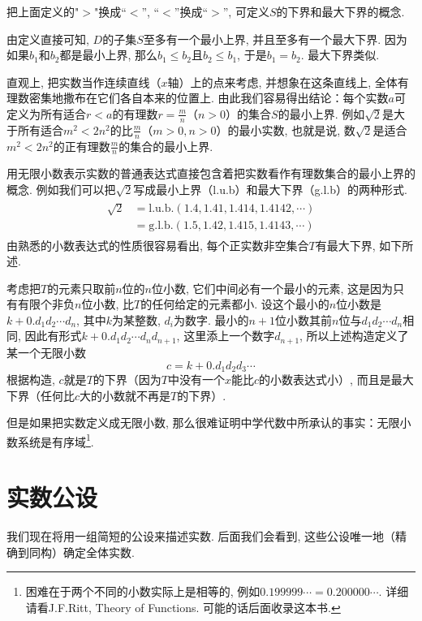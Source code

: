 把上面定义的"$>$"换成“$<$”, “$<$”换成“$>$”, 可定义$S$的下界和最大下界的概念. 

由定义直接可知, $D$的子集$S$至多有一个最小上界, 并且至多有一个最大下界. 因为如果$b_1$和$b_2$都是最小上界, 那么$b_1 \le b_2$且$b_2 \le b_1$, 于是$b_1=b_2$. 最大下界类似. 

直观上, 把实数当作连续直线（$x$轴）上的点来考虑, 并想象在这条直线上, 全体有理数密集地撒布在它们各自本来的位置上. 由此我们容易得出结论：每个实数$a$可定义为所有适合$r < a$的有理数$r = \frac{m}{n}$（$n > 0$）的集合$S$的最小上界. 例如$\sqrt{2}$是大于所有适合$m^2 < 2n^2$的比$\frac{m}{n}$（$m > 0, n > 0$）的最小实数, 也就是说, 数$\sqrt{2}$是适合$m^2<2n^2$的正有理数$\frac{m}{n}$的集合的最小上界. 

用无限小数表示实数的普通表达式直接包含着把实数看作有理数集合的最小上界的概念. 例如我们可以把$\sqrt{2}$写成最小上界（l.u.b）和最大下界（g.l.b）的两种形式. 
\begin{gather}\label{equ001040204}
\begin{aligned}
\sqrt{2} &= \text{l.u.b.}(1.4,1.41,1.414,1.4142,\cdots)\\
&=\text{g.l.b.}(1.5, 1.42, 1.415, 1.4143,\cdots)
\end{aligned}
\end{gather}
由熟悉的小数表达式的性质很容易看出, 每个正实数非空集合$T$有最大下界, 如下所述. 

考虑把$T$的元素只取前$n$位的$n$位小数, 它们中间必有一个最小的元素, 这是因为只有有限个非负$n$位小数, 比$T$的任何给定的元素都小. 设这个最小的$n$位小数是$k+0.d_1d_2\cdots{}d_n$, 其中$k$为某整数, $d_i$为数字. 最小的$n+1$位小数其前$n$位与$d_1d_2\cdots{}d_n$相同, 因此有形式$k+0.d_1d_2\cdots{}d_nd_{n+1}$, 这里添上一个数字$d_{n+1}$, 所以上述构造定义了某一个无限小数
\[
c = k + 0.d_1d_2d_3\cdots
\]
根据构造, $c$就是$T$的下界（因为$T$中没有一个$x$能比$c$的小数表达式小）, 而且是最大下界（任何比$c$大的小数就不再是$T$的下界）. 

但是如果把实数定义成无限小数, 那么很难证明中学代数中所承认的事实：无限小数系统是有序域\footnote{困难在于两个不同的小数实际上是相等的, 例如$0.199999\cdots=0.200000\cdots$. 详细请看J.F.Ritt, Theory of Functions. 可能的话后面收录这本书. }. 



\section{实数公设}\label{section0010403}
我们现在将用一组简短的公设来描述实数. 后面我们会看到, 这些公设唯一地（精确到同构）确定全体实数. 

